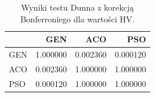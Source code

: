 \begin{table}
\caption{Wyniki testu Dunna z korekcją Bonferroniego dla wartości HV.}
\label{tab:dunn_global}
\begin{tabular}{lrrr}
\toprule
 & GEN & ACO & PSO \\
\midrule
GEN & 1.000000 & 0.002360 & 0.000120 \\
ACO & 0.002360 & 1.000000 & 1.000000 \\
PSO & 0.000120 & 1.000000 & 1.000000 \\
\bottomrule
\end{tabular}
\end{table}

